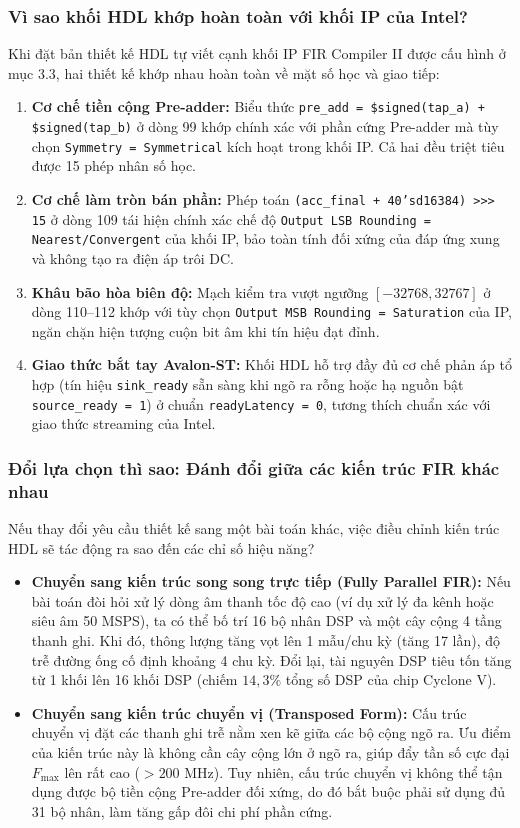 \subsubsection*{Vì sao khối HDL khớp hoàn toàn với khối IP của Intel?}
Khi đặt bản thiết kế HDL tự viết cạnh khối IP FIR Compiler II được cấu hình ở mục 3.3, hai thiết kế khớp nhau hoàn toàn về mặt số học và giao tiếp:
\begin{enumerate}[leftmargin=1.5em, itemsep=3pt]
    \item \textbf{Cơ chế tiền cộng Pre-adder:} Biểu thức \texttt{pre\_add = \$signed(tap\_a) + \$signed(tap\_b)} ở dòng 99 khớp chính xác với phần cứng Pre-adder mà tùy chọn \texttt{Symmetry = Symmetrical} kích hoạt trong khối IP. Cả hai đều triệt tiêu được 15 phép nhân số học.
    \item \textbf{Cơ chế làm tròn bán phần:} Phép toán \texttt{(acc\_final + 40'sd16384) >>> 15} ở dòng 109 tái hiện chính xác chế độ \texttt{Output LSB Rounding = Nearest/Convergent} của khối IP, bảo toàn tính đối xứng của đáp ứng xung và không tạo ra điện áp trôi DC.
    \item \textbf{Khâu bão hòa biên độ:} Mạch kiểm tra vượt ngưỡng $[-32768, 32767]$ ở dòng 110--112 khớp với tùy chọn \texttt{Output MSB Rounding = Saturation} của IP, ngăn chặn hiện tượng cuộn bit âm khi tín hiệu đạt đỉnh.
    \item \textbf{Giao thức bắt tay Avalon-ST:} Khối HDL hỗ trợ đầy đủ cơ chế phản áp tổ hợp (tín hiệu \texttt{sink\_ready} sẵn sàng khi ngõ ra rỗng hoặc hạ nguồn bật \texttt{source\_ready = 1}) ở chuẩn \texttt{readyLatency = 0}, tương thích chuẩn xác với giao thức streaming của Intel.
\end{enumerate}

\subsubsection*{Đổi lựa chọn thì sao: Đánh đổi giữa các kiến trúc FIR khác nhau}
Nếu thay đổi yêu cầu thiết kế sang một bài toán khác, việc điều chỉnh kiến trúc HDL sẽ tác động ra sao đến các chỉ số hiệu năng?
\begin{itemize}[leftmargin=1.5em, itemsep=3pt]
    \item \textbf{Chuyển sang kiến trúc song song trực tiếp (Fully Parallel FIR):} Nếu bài toán đòi hỏi xử lý dòng âm thanh tốc độ cao (ví dụ xử lý đa kênh hoặc siêu âm 50 MSPS), ta có thể bố trí 16 bộ nhân DSP và một cây cộng 4 tầng thanh ghi. Khi đó, thông lượng tăng vọt lên 1 mẫu/chu kỳ (tăng 17 lần), độ trễ đường ống cố định khoảng 4 chu kỳ. Đổi lại, tài nguyên DSP tiêu tốn tăng từ 1 khối lên 16 khối DSP (chiếm $14{,}3\%$ tổng số DSP của chip Cyclone V).
    \item \textbf{Chuyển sang kiến trúc chuyển vị (Transposed Form):} Cấu trúc chuyển vị đặt các thanh ghi trễ nằm xen kẽ giữa các bộ cộng ngõ ra. Ưu điểm của kiến trúc này là không cần cây cộng lớn ở ngõ ra, giúp đẩy tần số cực đại $F_{\max}$ lên rất cao ($> 200\text{ MHz}$). Tuy nhiên, cấu trúc chuyển vị không thể tận dụng được bộ tiền cộng Pre-adder đối xứng, do đó bắt buộc phải sử dụng đủ 31 bộ nhân, làm tăng gấp đôi chi phí phần cứng.
\end{itemize}

